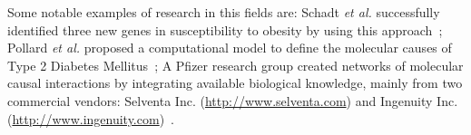 Some notable examples of research in this fields are: Schadt \emph{et al.} successfully identified three new genes in susceptibility to obesity by using this approach~\cite{schadt:2005};
Pollard \emph{et al.} proposed a computational model to define the molecular causes of Type 2 Diabetes Mellitus~\cite{pollard2005computational};  A Pfizer research group created networks of molecular causal interactions by integrating available biological knowledge, mainly from two commercial vendors: Selventa Inc. (\href{http://www.selventa.com}{http://www.selventa.com}) and Ingenuity Inc. (\href{http://www.ingenuity.com}{http://www.ingenuity.com})~\cite{chindelevitch2012causal}.

%
%
